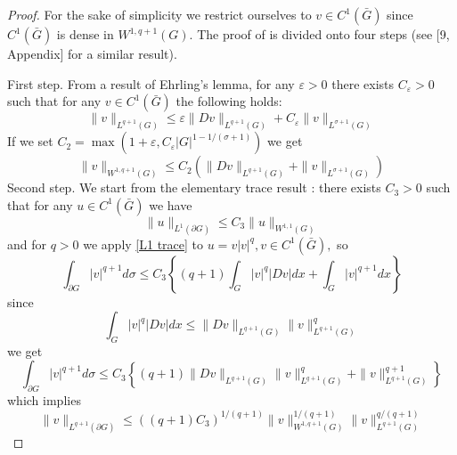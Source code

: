 \begin{proof}
	For the sake of simplicity we restrict ourselves to $v \in C^{1}(\bar{G})$ since $C^{1}(\bar{G})$ is dense in $W^{1, q+1}(G) .$ The proof of  is divided onto four steps (see [9, Appendix] for a similar result).
	
	First step. From a result of Ehrling's lemma, for any $\varepsilon>0$ there exists $C_{\varepsilon}>0$ such that for any $v \in C^{1}(\bar{G})$ the following holds:
	\begin{equation*}
		\|v\|_{L^{q+1}(G)} \leq \varepsilon\|D v\|_{L^{q+1}(G)}+C_{\varepsilon}\|v\|_{L^{\sigma+1}(G)}
	\end{equation*}
	If we set $C_{2}=\max \left(1+\varepsilon, C_{\varepsilon}|G|^{1-1 /(\sigma+1)}\right)$ we get
	\begin{equation}\label{ehrling inequality}
		\|v\|_{W^{1, q+1}(G)} \leq C_{2}\left(\|D v\|_{L^{q+1}(G)}+\|v\|_{L^{\sigma+1}(G)}\right)
	\end{equation}
Second step. We start from the elementary trace result \cite{Adams2003}: there exists $C_{3}>0$ such that for any $u \in C^{1}(\bar{G})$ we have
\begin{equation}\label{L1 trace}
	\|u\|_{L^{1}(\partial G)} \leq C_{3}\|u\|_{W^{1,1}(G)}
\end{equation}
and for $q>0$ we apply \eqref{L1 trace} to $u=v|v|^{q}, v \in C^{1}(\bar{G}),$ so
\begin{equation*}
	\int_{\partial G}|v|^{q+1} d \sigma \leq C_{3}\left\{(q+1) \int_{G}|v|^{q}|D v| d x+\int_{G}|v|^{q+1} d x\right\}
\end{equation*}
since
\begin{equation*}
	\int_{G}|v|^{q}|D v| d x \leq\|D v\|_{L^{q+1}(G)}\|v\|_{L^{q+1}(G)}^{q}
\end{equation*}
we get
\begin{equation*}
	\int_{\partial G}|v|^{q+1} d \sigma \leq C_{3}\left\{(q+1)\|D v\|_{L^{q+1}(G)}\|v\|_{L^{q+1}(G)}^{q}+\|v\|_{L^{q+1}(G)}^{q+1}\right\}
\end{equation*}
which implies
\begin{equation}\label{trace inequality of generalized l1}
	\|v\|_{L^{q+1}(\partial G)} \leq\left((q+1) C_{3}\right)^{1 /(q+1)}\|v\|_{W^{1, q+1}(G)}^{1 /(q+1)}\|v\|_{L^{q+1}(G)}^{q /(q+1)}
\end{equation}


\end{proof}

